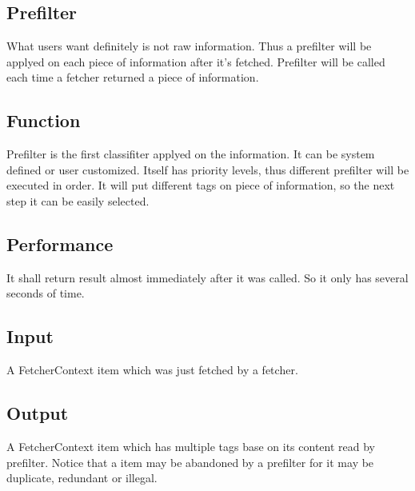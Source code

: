 
\subsection{Prefilter}
  What users want definitely is not raw information. Thus a prefilter will be applyed on each piece of information after it's fetched.
  Prefilter will be called each time a fetcher returned a piece of information.

  \subsection{Function}
    Prefilter is the first classifiter applyed on the information. It can be system defined or user customized.
    Itself has priority levels, thus different prefilter will be executed in order.
    It will put different tags on piece of information, so the next step it can be easily selected.

  \subsection{Performance}
    It shall return result almost immediately after it was called. So it only has several seconds of time.

  \subsection{Input}
    A FetcherContext item which was just fetched by a fetcher.

  \subsection{Output}
    A FetcherContext item which has multiple tags base on its content read by prefilter.
    Notice that a item may be abandoned by a prefilter for it may be duplicate, redundant or illegal.

